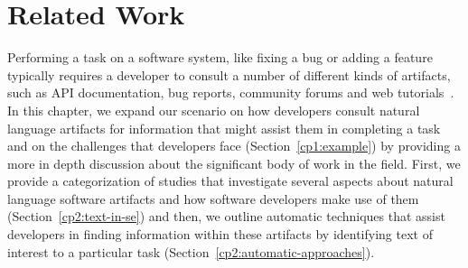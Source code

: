 \setcounter{chapter}{1}


\chapter{Related Work}
\label{ch:related-work}








Performing a task on a software system, like fixing a bug
or adding a feature typically requires a developer to consult
a number of different kinds of artifacts, such
as API documentation, bug reports, community forums
and web tutorials~\cite{umarji2008archetypal,Li2013}. 
In this chapter, 
we expand our scenario on how developers consult 
natural language artifacts
 for information that might assist them in completing a task 
and on the challenges that developers face (Section~\ref{cp1:example})
by providing a more in depth discussion 
about the significant body of work 
in the field. 
First, we provide 
a categorization of studies that investigate 
several aspects about natural language software artifacts 
and how software developers make use of them (Section~\ref{cp2:text-in-se})
and then, we outline automatic techniques that
assist developers in finding information within these artifacts by 
identifying text of interest 
to a particular task (Section~\ref{cp2:automatic-approaches}).
















